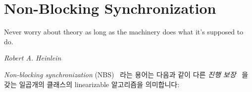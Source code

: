 \fi

\section{Non-Blocking Synchronization}
\label{sec:advsync:Non-Blocking Synchronization}
%
\epigraph{Never worry about theory as long as the machinery does what
	  it's supposed to do.}
	 {\emph{Robert A. Heinlein}}

\emph{Non-blocking synchronization} (NBS)~\cite{MauriceHerlihy90a} 라는 용어는
다음과 같이 다른 \emph{진행 보장}~\cite{DanAlitarh2013PracticalProgress} 을
갖는 일곱개의 클래스의 linearizable 알고리즘을 의미합니다:

\iffalse

The term \emph{non-blocking synchronization} (NBS)~\cite{MauriceHerlihy90a}
describes seven classes of linearizable algorithms with differing
\emph{forward-progress guarantees}~\cite{DanAlitarh2013PracticalProgress},
which are as follows:

\fi


